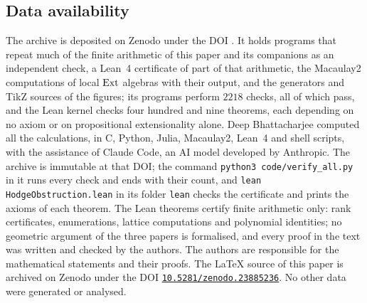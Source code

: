 \subsection*{Data availability}
The archive \cite{BMB26} is deposited on Zenodo under the DOI
\zenodoCodeDOI. It holds programs that repeat much of the finite arithmetic of this paper and its companions \cite{paperI,paperIII}
as an independent check, a Lean~4 certificate of part of that arithmetic, the
Macaulay2 computations of local $\operatorname{Ext}$ algebras with their output, and the
generators and TikZ sources of the figures; its programs perform $2218$
checks, all of which pass, and the Lean kernel checks four hundred and nine
theorems, each depending on no axiom or on propositional extensionality
alone. Deep Bhattacharjee computed all the calculations, in C, Python, Julia,
Macaulay2, Lean~4 and shell scripts, with the assistance of Claude Code, an
AI model developed by Anthropic. The archive is immutable at that DOI;
the command \texttt{python3 code/verify\_all.py} in it runs every check and
ends with their count, and \texttt{lean HodgeObstruction.lean} in its folder
\texttt{lean} checks the certificate and prints the axioms of each theorem.
The Lean theorems certify finite arithmetic only: rank certificates,
enumerations, lattice computations and polynomial identities; no geometric
argument of the three papers is formalised, and every proof in the text was
written and checked by the authors. The authors are responsible for the
mathematical statements and their proofs. The \LaTeX{} source of this paper is
archived on Zenodo under the DOI \href{https://doi.org/10.5281/zenodo.23885236}{\texttt{10.5281/zenodo.23885236}}.
No other data were generated or analysed.
